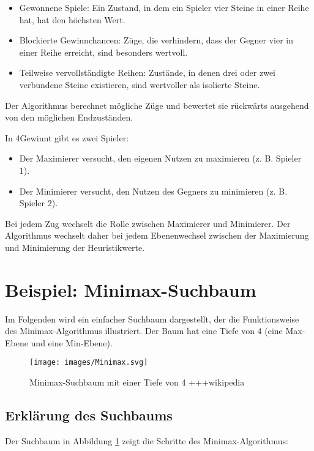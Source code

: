 \begin{itemize}
	\item Gewonnene Spiele: Ein Zustand, in dem ein Spieler vier Steine in einer Reihe hat, hat den höchsten Wert.
	\item Blockierte Gewinnchancen: Züge, die verhindern, dass der Gegner vier in einer Reihe erreicht, sind besonders wertvoll.
	\item Teilweise vervollständigte Reihen: Zustände, in denen drei oder zwei verbundene Steine existieren, sind wertvoller als isolierte Steine.
\end{itemize}

Der Algorithmus berechnet mögliche Züge und bewertet sie rückwärts ausgehend von den möglichen Endzuständen.

In 4Gewinnt gibt es zwei Spieler:

\begin{itemize}
	\item Der Maximierer versucht, den eigenen Nutzen zu maximieren (z. B. Spieler 1).
	\item Der Minimierer versucht, den Nutzen des Gegners zu minimieren (z. B. Spieler 2).
\end{itemize}

Bei jedem Zug wechselt die Rolle zwischen Maximierer und Minimierer. Der Algorithmus wechselt daher bei jedem Ebenenwechsel zwischen der Maximierung und Minimierung der Heuristikwerte.

\section*{Beispiel: Minimax-Suchbaum}

Im Folgenden wird ein einfacher Suchbaum dargestellt, der die Funktionsweise des Minimax-Algorithmus illustriert. Der Baum hat eine Tiefe von 4 (eine Max-Ebene und eine Min-Ebene).

\begin{figure}[H]
	\centering
	\texttt{[image: images/Minimax.svg]}
	\caption{Minimax-Suchbaum mit einer Tiefe von 4 +++wikipedia}
	\label{fig:minimax}
\end{figure}



\subsection*{Erklärung des Suchbaums}

Der Suchbaum in Abbildung \ref{fig:minimax} zeigt die Schritte des Minimax-Algorithmus:

